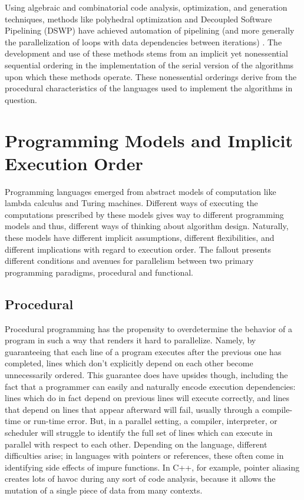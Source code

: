 Using algebraic and combinatorial code analysis, optimization, and generation
techniques, methods like polyhedral optimization and Decoupled Software
Pipelining (DSWP) have achieved automation of pipelining (and more generally the
parallelization of loops with data dependencies between iterations)
\cite{polyopt} \cite{dswp}. The development and use of these methods stems from
an implicit yet nonessential sequential ordering in the implementation of the
serial version of the algorithms upon which these methods operate. These
nonessential orderings derive from the procedural characteristics of the
languages used to implement the algorithms in question.

\section{Programming Models and Implicit Execution Order}
Programming languages emerged from abstract models of computation like lambda
calculus and Turing machines. Different ways of executing the computations
prescribed by these models gives way to different programming models and thus,
different ways of thinking about algorithm design. Naturally, these models have
different implicit assumptions, different flexibilities, and different
implications with regard to execution order. The fallout presents different
conditions and avenues for parallelism between two primary programming
paradigms, procedural and functional.

\subsection{Procedural}
Procedural programming has the propensity to overdetermine the behavior of a
program in such a way that renders it hard to parallelize. Namely, by
guaranteeing that each line of a program executes after the previous one has
completed, lines which don't explicitly depend on each other become
unnecessarily ordered. This guarantee does have upsides though, including the
fact that a programmer can easily and naturally encode execution dependencies:
lines which do in fact depend on previous lines will execute correctly, and
lines that depend on lines that appear afterward will fail, usually through a
compile-time or run-time error. But, in a parallel setting, a compiler,
interpreter, or scheduler will struggle to identify the full set of lines which
can execute in parallel with respect to each other. Depending on the language,
different difficulties arise; in languages with pointers or references, these
often come in identifying side effects of impure functions. In C++, for example,
pointer aliasing creates lots of havoc during any sort of code analysis, because
it allows the mutation of a single piece of data from many contexts.

